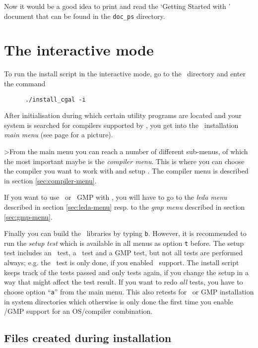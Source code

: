 Now it would be a good idea to print and read the `Getting Started
with \cgal' document that can be found in the \texttt{doc\_ps}
directory.

\section{The interactive mode}\label{sec:interactive-mode}

To run the install script in the interactive mode, go to the \cgaldir\ 
directory and enter the command
\begin{verbatim}
      ./install_cgal -i
\end{verbatim}

After initialisation during which certain utility programs are located
and your system is searched for compilers supported by \cgal, you get
into the \cgal\ installation {\em main menu} (see page
\pageref{pic:main-menu} for a picture).

>From the main menu you can reach a number of different sub-menus, of
which the most important maybe is the {\em compiler menu}. This is
where you can choose the compiler you want to work with and setup \stl.
The compiler menu is described in section \ref{sec:compiler-menu}.

If you want to use \leda\ or \gnu\ GMP with \cgal, you will have to go
to the {\em leda menu} described in section \ref{sec:leda-menu} resp.
to the {\em gmp menu} described in section \ref{sec:gmp-menu}.

Finally you can build the \cgal\ libraries by typing \texttt{b}.
However, it is recommended to run the {\em setup test} which is
available in all menus as option \texttt{t} before. The setup test
includes an \stl\ test, a \leda\ test and a GMP test, but not all
tests are performed always; e.g. the \leda\ test is only done, if you
enabled \leda\ support. The install script keeps track of the tests
passed and only tests again, if you change the setup in a way that
might affect the test result. If you want to redo \textit{all} tests,
you have to choose option ``\texttt{a}'' from the main menu. This also
retests for \leda\ or GMP installation in system directories which
otherwise is only done the first time you enable \leda/GMP support for
an OS/compiler combination.

\subsection{Files created during installation}

